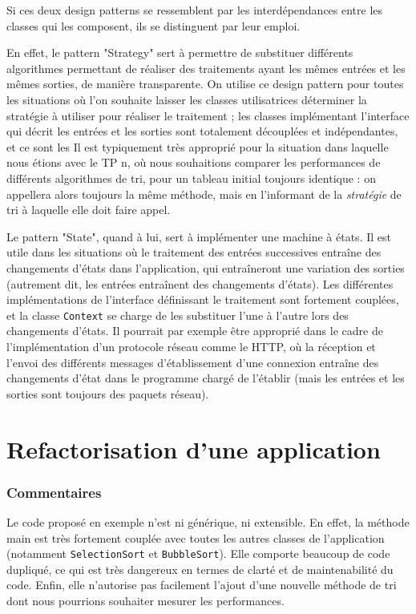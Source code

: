     Si ces deux design patterns se ressemblent par les interdépendances entre les classes qui les composent,
    ils se distinguent par leur emploi.

    En effet, le pattern "Strategy" sert
    à permettre de substituer différents algorithmes
    permettant de réaliser des traitements ayant les
    mêmes entrées et les mêmes sorties, de manière transparente.
    On utilise ce design pattern pour toutes les
    situations où l'on souhaite laisser les classes utilisatrices déterminer la stratégie à utiliser pour
    réaliser le traitement ; les classes implémentant l'interface qui décrit les entrées et les sorties
    sont totalement découplées et indépendantes, et ce sont les
    Il est typiquement
    très approprié pour la situation dans laquelle nous étions avec le TP n,
    où nous souhaitions comparer
    les performances de différents algorithmes de tri, pour un tableau initial toujours identique :
    on appellera alors toujours la même méthode, mais en l'informant de la \textit{stratégie} de tri
    à laquelle elle doit faire appel.

    Le pattern "State", quand à lui, sert à implémenter une machine à états. Il est utile dans les situations
    où le traitement des entrées successives entraîne des changements d'états dans l'application, qui
    entraîneront une variation des sorties (autrement dit, les entrées entraînent des changements d'états).
    Les différentes implémentations de l'interface définissant le traitement sont fortement couplées, et la
    classe \texttt{Context} se charge de les substituer l'une à l'autre lors des changements d'états.
    Il pourrait par exemple être approprié dans le cadre de l'implémentation d'un protocole réseau
    comme le HTTP, où la réception et l'envoi des différents messages d'établissement d'une connexion entraîne
    des changements d'état dans le programme chargé de l'établir (mais les entrées et les sorties sont
    toujours des paquets réseau).


\part{Refactorisation d'une application}

  \section{Commentaires}

    Le code proposé en exemple n'est ni générique, ni extensible.
    En effet, la méthode main est très fortement couplée avec toutes les autres classes de l'application
    (notamment \texttt{SelectionSort} et \texttt{BubbleSort}).
    Elle comporte beaucoup de code dupliqué, ce qui est très dangereux en termes de clarté et de
    maintenabilité du code.
    Enfin, elle n'autorise pas facilement l'ajout d'une nouvelle
    méthode de tri dont nous pourrions souhaiter mesurer les performances.

